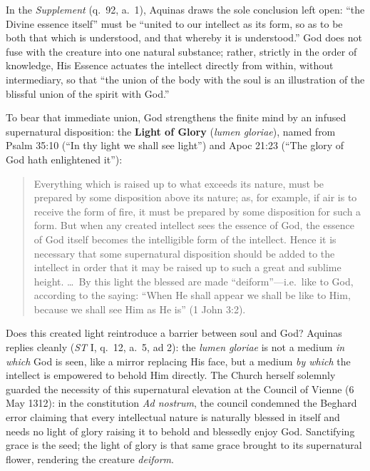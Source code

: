 In the \textit{Supplement} (q.\ 92, a.\ 1), Aquinas draws the sole conclusion left open: ``the Divine essence itself'' must be ``united to our intellect as its form, so as to be both that which is understood, and that whereby it is understood.'' God does not fuse with the creature into one natural substance; rather, strictly in the order of knowledge, His Essence actuates the intellect directly from within, without intermediary, so that ``the union of the body with the soul is an illustration of the blissful union of the spirit with God.''

To bear that immediate union, God strengthens the finite mind by an infused supernatural disposition: the \textbf{Light of Glory} (\textit{lumen gloriae}), named from Psalm 35:10 (``In thy light we shall see light'') and Apoc 21:23 (``The glory of God hath enlightened it''):

\begin{quote}
Everything which is raised up to what exceeds its nature, must be prepared by some disposition above its nature; as, for example, if air is to receive the form of fire, it must be prepared by some disposition for such a form. But when any created intellect sees the essence of God, the essence of God itself becomes the intelligible form of the intellect. Hence it is necessary that some supernatural disposition should be added to the intellect in order that it may be raised up to such a great and sublime height. \dots\ By this light the blessed are made ``deiform''---i.e.\ like to God, according to the saying: ``When He shall appear we shall be like to Him, because we shall see Him as He is'' (1 John 3:2).
\end{quote}

Does this created light reintroduce a barrier between soul and God? Aquinas replies cleanly (\textit{ST} I, q.\ 12, a.\ 5, ad 2): the \textit{lumen gloriae} is not a medium \textit{in which} God is seen, like a mirror replacing His face, but a medium \textit{by which} the intellect is empowered to behold Him directly. The Church herself solemnly guarded the necessity of this supernatural elevation at the Council of Vienne (6 May 1312): in the constitution \textit{Ad nostrum}, the council condemned the Beghard error claiming that every intellectual nature is naturally blessed in itself and needs no light of glory raising it to behold and blessedly enjoy God. Sanctifying grace is the seed; the light of glory is that same grace brought to its supernatural flower, rendering the creature \textit{deiform}.

